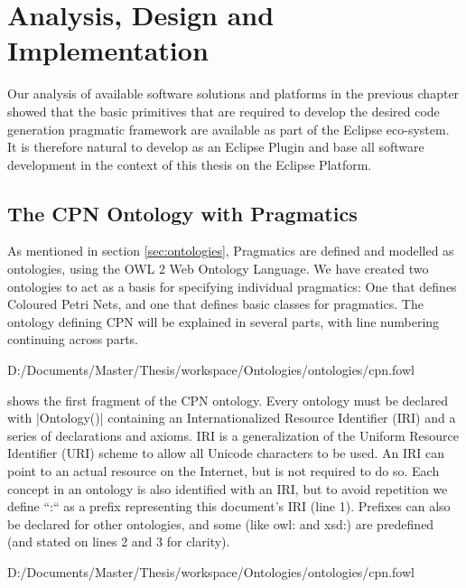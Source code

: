 \chapter{Analysis, Design and Implementation}
\label{chap:analysis}

Our analysis of available software solutions and platforms in the previous
chapter showed that the basic primitives that are required to develop the
desired code generation pragmatic framework are available as part of the
Eclipse eco-system. It is therefore natural to develop \thename{} as an Eclipse Plugin
and base all software development in the context of this thesis on the Eclipse
Platform.

\section{The CPN Ontology with Pragmatics}

As mentioned in section \ref{sec:ontologies}, Pragmatics are defined and modelled
as ontologies, using the OWL 2 Web Ontology Language. We have created two
ontologies to act as a basis for specifying individual pragmatics:
One that defines Coloured Petri Nets, and one that defines basic classes for pragmatics.
The ontology defining CPN will be explained in several parts, with line
numbering continuing across parts.


{D:/Documents/Master/Thesis/workspace/Ontologies/ontologies/cpn.fowl}

 shows the first fragment of the CPN ontology. Every
ontology must be declared with |Ontology()| containing an Internationalized Resource
Identifier (IRI) and a series of declarations and axioms. IRI is a
generalization of the Uniform Resource Identifier (URI) scheme to allow all
Unicode characters to be used. An IRI can point to an actual resource on the Internet,
but is not required to do so. Each concept in an ontology is also identified
with an IRI, but to avoid repetition we define ``:`` as a prefix representing
this document's IRI (line 1). Prefixes can also be declared for other
ontologies, and some (like owl: and xsd:) are predefined (and stated on lines 2
and 3 for clarity). 


{D:/Documents/Master/Thesis/workspace/Ontologies/ontologies/cpn.fowl} 

